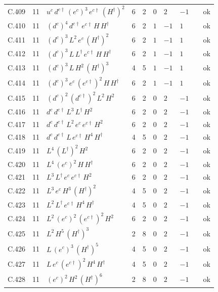 {\begin{longtable}{@{}ll>{\raggedright\arraybackslash}p{6.4cm}rrllllr@{}}
C.409 & 11 & $u^c\,d^{c\dagger}\,(e^c)^{3}\,e^{c\dagger}\,(H^\dagger)^{2}$ & 6 & 2 & $0$ & $2$ & $-1$ &  & ok \\
C.410 & 11 & $(d^c)^{4}\,d^{c\dagger}\,e^{c\dagger}\,H\,H^\dagger$ & 6 & 2 & $1$ & $-1$ & $1$ &  & ok \\
C.411 & 11 & $(d^c)^{3}\,L^{2}\,e^c\,(H^\dagger)^{2}$ & 6 & 2 & $1$ & $-1$ & $1$ &  & ok \\
C.412 & 11 & $(d^c)^{3}\,L\,L^\dagger\,e^{c\dagger}\,H\,H^\dagger$ & 6 & 2 & $1$ & $-1$ & $1$ &  & ok \\
C.413 & 11 & $(d^c)^{3}\,L\,H^{2}\,(H^\dagger)^{3}$ & 4 & 5 & $1$ & $-1$ & $1$ &  & ok \\
C.414 & 11 & $(d^c)^{3}\,e^c\,(e^{c\dagger})^{2}\,H\,H^\dagger$ & 6 & 2 & $1$ & $-1$ & $1$ &  & ok \\
C.415 & 11 & $(d^c)^{2}\,(d^{c\dagger})^{2}\,L^{2}\,H^{2}$ & 6 & 2 & $0$ & $2$ & $-1$ &  & ok \\
C.416 & 11 & $d^c\,d^{c\dagger}\,L^{3}\,L^\dagger\,H^{2}$ & 6 & 2 & $0$ & $2$ & $-1$ &  & ok \\
C.417 & 11 & $d^c\,d^{c\dagger}\,L^{2}\,e^c\,e^{c\dagger}\,H^{2}$ & 6 & 2 & $0$ & $2$ & $-1$ &  & ok \\
C.418 & 11 & $d^c\,d^{c\dagger}\,L\,e^{c\dagger}\,H^{4}\,H^\dagger$ & 4 & 5 & $0$ & $2$ & $-1$ &  & ok \\
C.419 & 11 & $L^{4}\,(L^\dagger)^{2}\,H^{2}$ & 6 & 2 & $0$ & $2$ & $-1$ &  & ok \\
C.420 & 11 & $L^{4}\,(e^c)^{2}\,H\,H^\dagger$ & 6 & 2 & $0$ & $2$ & $-1$ &  & ok \\
C.421 & 11 & $L^{3}\,L^\dagger\,e^c\,e^{c\dagger}\,H^{2}$ & 6 & 2 & $0$ & $2$ & $-1$ &  & ok \\
C.422 & 11 & $L^{3}\,e^c\,H^{3}\,(H^\dagger)^{2}$ & 4 & 5 & $0$ & $2$ & $-1$ &  & ok \\
C.423 & 11 & $L^{2}\,L^\dagger\,e^{c\dagger}\,H^{4}\,H^\dagger$ & 4 & 5 & $0$ & $2$ & $-1$ &  & ok \\
C.424 & 11 & $L^{2}\,(e^c)^{2}\,(e^{c\dagger})^{2}\,H^{2}$ & 6 & 2 & $0$ & $2$ & $-1$ &  & ok \\
C.425 & 11 & $L^{2}\,H^{5}\,(H^\dagger)^{3}$ & 2 & 8 & $0$ & $2$ & $-1$ &  & ok \\
C.426 & 11 & $L\,(e^c)^{3}\,(H^\dagger)^{5}$ & 4 & 5 & $0$ & $2$ & $-1$ &  & ok \\
C.427 & 11 & $L\,e^c\,(e^{c\dagger})^{2}\,H^{4}\,H^\dagger$ & 4 & 5 & $0$ & $2$ & $-1$ &  & ok \\
C.428 & 11 & $(e^c)^{2}\,H^{2}\,(H^\dagger)^{6}$ & 2 & 8 & $0$ & $2$ & $-1$ &  & ok \\

\end{longtable}}
